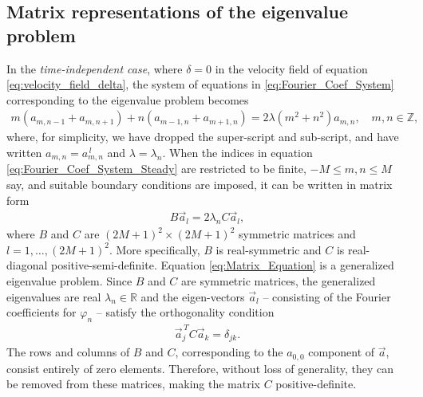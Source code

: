\documentclass[11pt]{amsart}
\begin{document}
\subsection{Matrix representations of the eigenvalue problem}
%
In the \emph{time-independent case}, where $\delta=0$ in the velocity field
of equation \eqref{eq:velocity_field_delta}, the system of equations in
\eqref{eq:Fourier_Coef_System} corresponding to the eigenvalue problem
becomes 
%
\begin{align}\label{eq:Fourier_Coef_System_Steady}
  m(a_{m,n-1}+a_{m,n+1})+n(a_{m-1,n}+a_{m+1,n})=2\lambda(m^2+n^2)a_{m,n},
  \quad m,n\in\mathbb{Z},
\end{align}
%
where, for simplicity, we have dropped the super-script and
sub-script, and have written $a_{m,n}=a^{\,l}_{m,n}$ and
$\lambda=\lambda_n$. When the indices in equation
\eqref{eq:Fourier_Coef_System_Steady} are restricted to be finite,
$-M\leq m,n\leq M$ say, and suitable boundary conditions are imposed, it can
be written in matrix form   
%
\begin{align}\label{eq:Matrix_Equation}
  B\vec{a}_l=2\lambda_n C\vec{a}_l,
\end{align}
%
where $B$ and $C$ are $(2M+1)^2\times(2M+1)^2$ symmetric matrices and
$l=1,\ldots,(2M+1)^2$. More specifically, $B$ is real-symmetric and $C$ is
real-diagonal positive-semi-definite. Equation
\eqref{eq:Matrix_Equation} is a generalized eigenvalue problem. Since
$B$ and $C$ are symmetric matrices, the generalized eigenvalues are
real $\lambda_n\in\mathbb{R}$ and the eigen-vectors $\vec{a}_l$ -- consisting
of the Fourier coefficients for $\varphi_n$ -- satisfy the orthogonality
condition 
%
\begin{align}\label{eq:Matrix_Ortho}
  \vec{a}_j^{\,T}C\vec{a}_k=\delta_{jk}.
\end{align}
%
The rows and columns of $B$ and $C$, corresponding to the $a_{0,0}$
component of $\vec{a}$, consist entirely of zero elements. Therefore,
without loss of generality, they can be removed from these matrices,
making the matrix $C$ positive-definite. 
\end{document}
